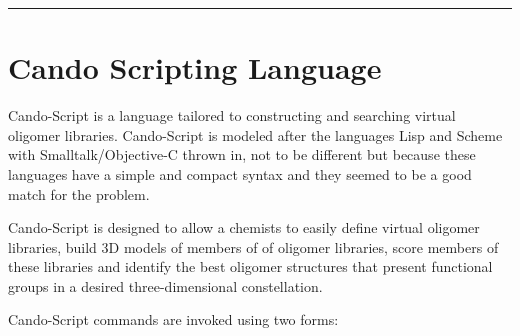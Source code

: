 \rule{6in}{0.01cm}\par
{}\par
\chapter{Cando Scripting Language}
Cando-Script is a language tailored to constructing and searching virtual oligomer libraries.
Cando-Script is modeled after the languages Lisp and Scheme with Smalltalk/Objective-C thrown in, not to be different but because
these languages have a simple and compact syntax and they seemed to be a good match for the
problem.\par

Cando-Script is designed to allow a chemists to easily define virtual oligomer libraries, build 3D models of members of of
oligomer libraries, score members of these libraries and identify the best 
oligomer structures that present functional groups
in a desired three-dimensional constellation.\par

Cando-Script commands are invoked using two forms: 

